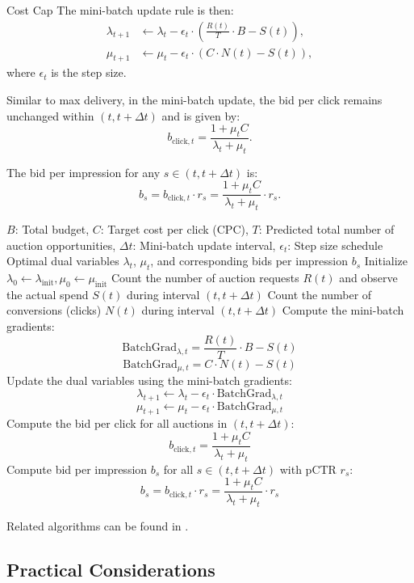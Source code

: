 \documentclass[../main.tex]{subfiles}
\begin{document}
\begin{section}{Cost Cap}
	The mini-batch update rule is then:
	\begin{equation*}
		\begin{aligned}
			\lambda_{t+1} & \gets \lambda_t - \epsilon_t \cdot \left( \frac{R(t)}{T} \cdot B - S(t) \right), \\
			\mu_{t+1} & \gets \mu_t - \epsilon_t \cdot \left( C \cdot N(t) - S(t) \right),
		\end{aligned}
	\end{equation*}
	where $\epsilon_t$ is the step size.
	
	Similar to max delivery, in the mini-batch update, the bid per click remains unchanged within $(t, t + \Delta t)$ and is given by:
	\[
	b_{\text{click}, t} = \frac{1 + \mu_t C}{\lambda_t + \mu_t}.
	\]
	
	The bid per impression for any $s \in (t, t+\Delta t)$ is:
	\[
	b_s = b_{\text{click}, t} \cdot r_s = \frac{1 + \mu_t C}{\lambda_t + \mu_t} \cdot r_s.
	\]
	
	\begin{algorithm}[H]
		\caption{Mini-Batch DOGD for Cost Cap Problem}
		\label{alg:minibatch_dogd_costcap}
		\begin{algorithmic}[1]
			\Require $B$: Total budget, $C$: Target cost per click (CPC), $T$: Predicted total number of auction opportunities, $\Delta t$: Mini-batch update interval, $\epsilon_t$: Step size schedule
			\Ensure Optimal dual variables $\lambda_t$, $\mu_t$, and corresponding bids per impression $b_s$
			\State Initialize $\lambda_0 \gets \lambda_{\text{init}}, \mu_0 \gets \mu_{\text{init}}$ 
			 
			\State Count the number of auction requests $R(t)$ and observe the actual spend $S(t)$ during interval $(t, t + \Delta t)$
			\State Count the number of conversions (clicks) $N(t)$ during interval $(t, t + \Delta t)$
			\State Compute the mini-batch gradients:
			\[
			\text{BatchGrad}_{\lambda, t} = \frac{R(t)}{T} \cdot B - S(t)
			\]
			\[
			\text{BatchGrad}_{\mu, t} = C \cdot N(t) - S(t)
			\]
			\State Update the dual variables using the mini-batch gradients:
			\[
			\lambda_{t+1} \gets \lambda_t - \epsilon_t \cdot \text{BatchGrad}_{\lambda, t}
			\]
			\[
			\mu_{t+1} \gets \mu_t - \epsilon_t \cdot \text{BatchGrad}_{\mu, t}
			\]
			\State Compute the bid per click for all auctions in $(t, t + \Delta t)$:
			\[
			b_{\text{click}, t} = \frac{1 + \mu_t C}{\lambda_t + \mu_t}
			\]
			\State Compute bid per impression $b_s$ for all $s \in (t, t + \Delta t)$ with pCTR $r_s$:
			\[
			b_s = b_{\text{click}, t} \cdot r_s = \frac{1 + \mu_t C}{\lambda_t + \mu_t} \cdot r_s
			\]
			\EndFor
		\end{algorithmic}
	\end{algorithm}
	
	
	Related algorithms can be found in \cite{gao2022bidding}.
	
	
	\subsection*{Practical Considerations}
	
	
	\end{section}
	
\end{document}
